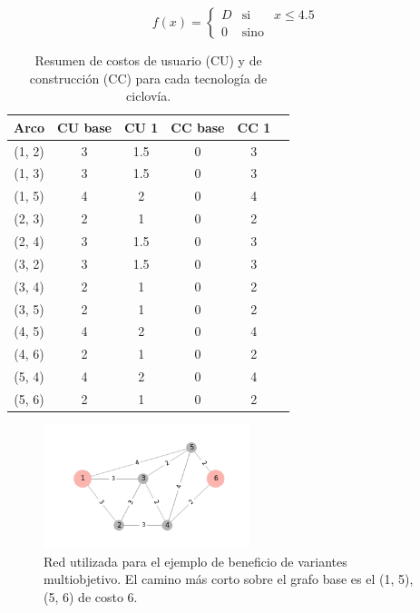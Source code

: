 \documentclass{article}
\begin{document}
  $$
    f(x) = \left\{ \begin{array}{lcr}
            D & \mbox{si}   & x \leq 4.5 \\
            0 & \mbox{sino} &
          \end{array}
          \right.
  $$

  \begin{table}[h!]
    \centering
    \begin{tabular}{cccccc}
      \toprule
      Arco & CU base & CU 1 & CC base & CC 1 & \\
      \midrule
        (1, 2) & 3 & 1.5 & 0 & 3 \\
        (1, 3) & 3 & 1.5 & 0 & 3 \\
        (1, 5) & 4 & 2   & 0 & 4 \\
        (2, 3) & 2 & 1   & 0 & 2 \\
        (2, 4) & 3 & 1.5 & 0 & 3 \\
        (3, 2) & 3 & 1.5 & 0 & 3 \\
        (3, 4) & 2 & 1   & 0 & 2 \\
        (3, 5) & 2 & 1   & 0 & 2 \\
        (4, 5) & 4 & 2   & 0 & 4 \\
        (4, 6) & 2 & 1   & 0 & 2 \\
        (5, 4) & 4 & 2   & 0 & 4 \\
        (5, 6) & 2 & 1   & 0 & 2 \\
      \bottomrule
    \end{tabular}
      \caption{Resumen de costos de usuario (CU) y de construcción (CC) para cada tecnología de ciclovía.}\label{table:example2arccosts}
  \end{table}

  \begin{figure}[h!]
    \centering
    \includegraphics[width=6cm]{../resources/example_2_base.png}
    \caption{Red utilizada para el ejemplo de beneficio de variantes multiobjetivo. El camino más corto sobre el grafo base es el (1, 5), (5, 6) de costo 6.}
    \label{fig:example2base}
  \end{figure}
\end{document}
